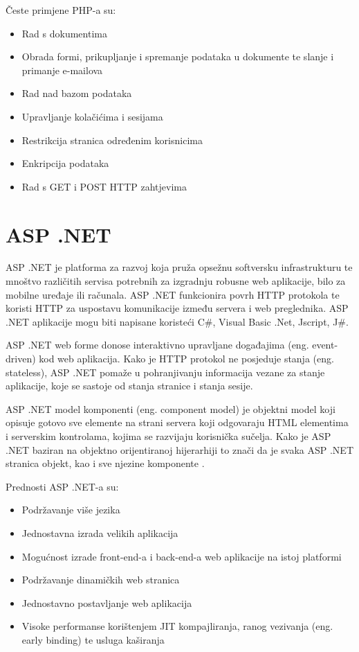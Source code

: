 \documentclass[12pt, oneside, onecolumn]{book}
\begin{document}
{Česte primjene PHP-a su:

\begin{itemize}
\item Rad s dokumentima
\item Obrada formi, prikupljanje i spremanje podataka u dokumente te slanje i primanje e-mailova
\item Rad nad bazom podataka
\item Upravljanje kolačićima i sesijama
\item Restrikcija stranica određenim korisnicima
\item Enkripcija podataka
\item Rad s GET i POST HTTP zahtjevima
\end{itemize}

\pagebreak

\section{ASP .NET}
ASP .NET je platforma za razvoj koja pruža opsežnu softversku infrastrukturu te mnoštvo različitih servisa potrebnih za izgradnju robusne web aplikacije, bilo za mobilne uređaje ili računala. ASP .NET funkcionira povrh HTTP protokola te koristi HTTP za uspostavu komunikacije između servera i web preglednika. ASP .NET aplikacije mogu biti napisane koristeći C\#, Visual Basic .Net, Jscript, J\#.

ASP .NET web forme donose interaktivno upravljane događajima (eng. event-driven) kod web aplikacija. Kako je HTTP protokol ne posjeduje stanja (eng. stateless), ASP .NET pomaže u pohranjivanju informacija vezane za stanje aplikacije, koje se sastoje od stanja stranice i stanja sesije.

ASP .NET model komponenti (eng. component model) je objektni model koji opisuje gotovo sve elemente na strani servera koji odgovaraju HTML elementima i serverskim kontrolama, kojima se razvijaju korisnička sučelja. Kako je ASP .NET baziran na objektno orijentiranoj hijerarhiji to znači da je svaka ASP .NET stranica objekt, kao i sve njezine komponente \cite{aspnet}. 

Prednosti ASP .NET-a su:

\begin{itemize}
\item Podržavanje više jezika
\item Jednostavna izrada velikih aplikacija
\item Mogućnost izrade front-end-a i back-end-a web aplikacije na istoj platformi
\item Podržavanje dinamičkih web stranica
\item Jednostavno postavljanje web aplikacija
\item Visoke performanse korištenjem JIT kompajliranja, ranog vezivanja (eng. early binding) te usluga kaširanja
\end{itemize}

}
\end{document}
